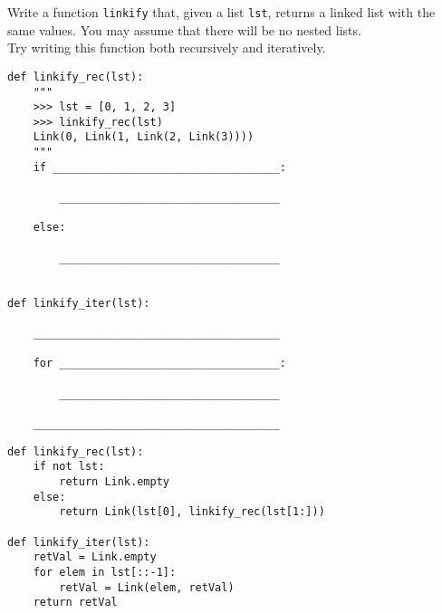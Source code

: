 \begin{blocksection}
\question Write a function \texttt{linkify} that, given a list \texttt{lst}, returns a linked list with the same values. You may assume that there will be no nested lists. \\

Try writing this function both recursively and iteratively. \\

\begin{lstlisting}
def linkify_rec(lst):
    """
    >>> lst = [0, 1, 2, 3]
    >>> linkify_rec(lst)
    Link(0, Link(1, Link(2, Link(3))))
    """
    if ___________________________________:

        __________________________________

    else: 

        __________________________________


def linkify_iter(lst):

    ______________________________________

    for __________________________________:

        __________________________________

    ______________________________________

\end{lstlisting}
\begin{solution}[1in]
\begin{lstlisting}
def linkify_rec(lst):
    if not lst:
        return Link.empty
    else:
        return Link(lst[0], linkify_rec(lst[1:]))

def linkify_iter(lst):
    retVal = Link.empty
    for elem in lst[::-1]:
        retVal = Link(elem, retVal)
    return retVal
\end{lstlisting}
\end{solution}
\end{blocksection}
